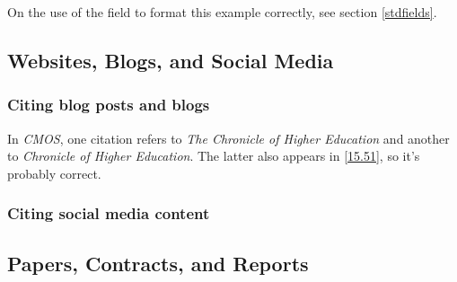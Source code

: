 \documentclass[11pt,letterpaper,oneside]{article}
\begin{document}
On the use of the  field to format this example
correctly, see section \ref{stdfields}.

\begin{citebib}
\item \cite{zeitung1828}
\end{citebib}

\setcounter{subsection}{6}
\subsection{Websites, Blogs, and Social Media}
\setcounter{subsection}{14}

\setcounter{subsubsection}{207}
\subsubsection{Citing blog posts and blogs}
\label{14.208}

In \textit{CMOS}, one citation refers to \textit{The Chronicle of
Higher Education} and another to \textit{Chronicle of Higher
Education}. The latter also appears in \ref{15.51}, so it's probably
correct.

\begin{citebib}
\item \cite{amlen2015}
\item \cite{germano2017}
\item \cite{amlen}
\item \cite{linguafranca}
\item \cite{jim2017}
\end{citebib}

\subsubsection{Citing social media content}

\begin{citebib}
\item \cite{diaz2016}
\item \cite{obrien2015}
\item \cite{chicago2015}
\item \cite{licis2016}
\end{citebib}

\setcounter{subsection}{7}
\subsection{Papers, Contracts, and Reports}
\setcounter{subsection}{14}
\end{document}
